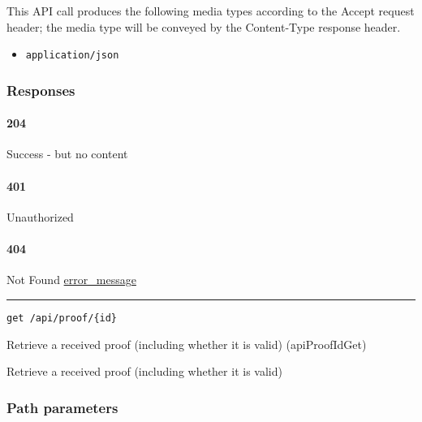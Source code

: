 This API call produces the following media types according to the
{Accept} request header; the media type will be conveyed by the
{Content-Type} response header.

\begin{itemize}
\tightlist
\item
  \texttt{application/json}
\end{itemize}

\hypertarget{responses-167}{%
\subsubsection{Responses}\label{responses-167}}

\hypertarget{section-538}{%
\paragraph{204}\label{section-538}}

Success - but no content \protect\hyperlink{}{}

\hypertarget{section-539}{%
\paragraph{401}\label{section-539}}

Unauthorized \protect\hyperlink{}{}

\hypertarget{section-540}{%
\paragraph{404}\label{section-540}}

Not Found \protect\hyperlink{error_message}{error\_message}

\begin{center}\rule{0.5\linewidth}{\linethickness}\end{center}

\protect\hypertarget{apiProofIdGet}{}{}

\begin{verbatim}
get /api/proof/{id}
\end{verbatim}

Retrieve a received proof (including whether it is valid)
({apiProofIdGet})

Retrieve a received proof (including whether it is valid)

\hypertarget{path-parameters-90}{%
\subsubsection{Path parameters}\label{path-parameters-90}}

